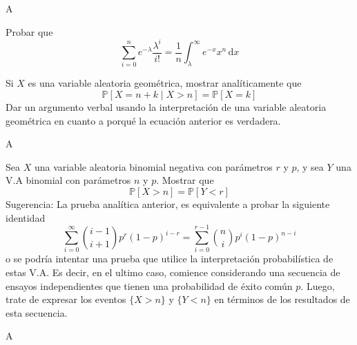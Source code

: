 \documentclass[11pt,answers,addpoints,a4paper,tittlepage=true,DIV=15,headsepline]{kommaexam}%
\theoremstyle{definition}
\begin{document}
\begin{questions}
	\begin{solutionorgrid}
	A
	\end{solutionorgrid}

\framedsolutions
	\question%
	Probar que
	\begin{equation*}
	\sum_{i=0}^{n}e^{-\lambda}\frac{\lambda^{i}}{i!}=\frac{1}{n}\int_{\lambda}^{\infty}e^{-x}x^{n}\,\mathrm{d}x
	\end{equation*}
	
	\question Si $X$ es una variable aleatoria geométrica, mostrar analíticamente que
	\begin{equation*}
	\mathds{P}[X=n+k\mid X>n]=\mathds{P}[X=k]
	\end{equation*}
	Dar un argumento verbal usando la interpretación de una variable aleatoria geométrica en cuanto a porqué la ecuación anterior es verdadera.
	
	\begin{solutionorbox}
		A
	\end{solutionorbox}
	
	\unframedsolutions
	
	
	\question Sea $X$ una variable aleatoria binomial negativa con parámetros $r$ y $p$, y sea $Y$ una V.A binomial con parámetros $n$ y $p$. Mostrar que
	\begin{equation*}
	\mathds{P}[X>n]=\mathds{P}[Y<r]
	\end{equation*}
	Sugerencia: La prueba analítica anterior, es equivalente a probar la siguiente identidad
	\begin{equation*}
	\sum_{i=0}^{\infty}\binom{i-1}{i+1}p^{r}{(1-p)}^{i-r}=\sum_{i=0}^{r-1}\binom{n}{i}p^{i}{(1-p)}^{n-i}
	\end{equation*}
	o se podría intentar una prueba que utilice la interpretación probabilística de estas V.A. Es decir, en el ultimo caso, comience considerando una secuencia de ensayos independientes que tienen una probabilidad de éxito común $p$. Luego, trate de expresar los eventos $\{X > n\}$ y $\{Y < n\}$ en términos de los resultados de esta secuencia.
	
	\begin{solutionorbox}
		A
	\end{solutionorbox}
	

\end{questions}
\end{document}
